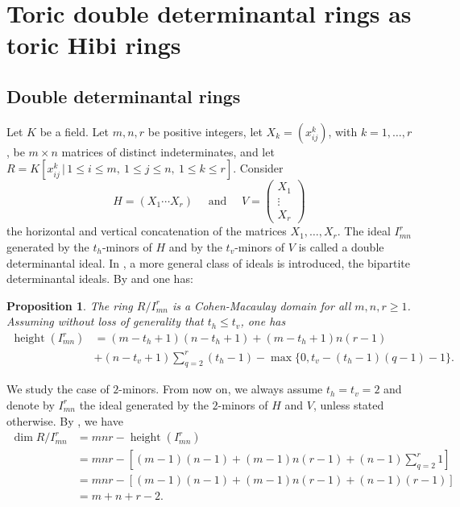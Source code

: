 \documentclass[12pt]{amsart}
\numberwithin{equation}{section}
\newtheorem{proposition}[theorem]{Proposition}
\theoremstyle{definition}
\DeclareMathOperator{\height}{height}
\begin{document}
\section{Toric double determinantal rings as toric Hibi rings}
\subsection{Double determinantal rings}
Let $K$ be a field. Let $m,n,r$ be positive integers, let $X_k=(x_{ij}^k)$, with $k=1,\ldots,r$, be $m\times n$ 
matrices of distinct indeterminates, 
 and let $R = K[x_{ij}^k\,|\, 1\le i\le m,\ 1\le j\le n, \ 1 \le k \le r]$. 
Consider 
 $$H=(X_1\cdots X_r)  \quad \text{ and } \quad V =\left(\begin{matrix} X_1 \\ \vdots \\ X_r \end{matrix}\right)$$  
 the horizontal and vertical concatenation of the matrices $X_1,\ldots, X_r$. 
 The ideal $I_{mn}^r$  generated by the $t_h$-minors of $H$ and by the $t_v$-minors of $V$ is called a double determinantal ideal.
 In \cite{L}, a more general class of ideals is introduced, the bipartite determinantal ideals. By \cite[Corollary 3.3 and Corollary 4.5]{FK} and \cite[Corollary 1.3]{L} one has:
\begin{proposition}
\label{prop: CM}
The ring $R/I_{mn}^r$ is a Cohen-Macaulay domain for all $m,n,r\ge 1$. Assuming without loss of generality that $t_h\leq t_v$, one has
    \begin{align*}
    \height(I_{mn}^r)& =(m-t_h+1)(n-t_h+1)+(m-t_h+1)n(r-1)\\
    &+(n-t_v+1)\sum_{q=2}^r(t_h-1)-\max\{0, t_v-(t_h-1)(q-1) -1\}. 
    \end{align*}
\end{proposition}
\medskip
We study the case of $2$-minors. From now on, we always assume $t_h=t_v=2$ and denote by $I_{mn}^r$ the ideal generated by the $2$-minors of $H$ and $V$, unless stated otherwise. By , we have 
\begin{equation} 
\label{eqn:dim}
\begin{split}
\dim R/I_{mn}^r&=mnr-\height(I_{mn}^r)\\
&=mnr-[(m-1)(n-1)+(m-1)n(r-1)+(n-1)\sum_{q=2}^r1]\\
&=mnr-[(m-1)(n-1)+(m-1)n(r-1)+(n-1)(r-1)]\\
&=m+n+r-2.
\end{split}
\end{equation}
\end{document}
